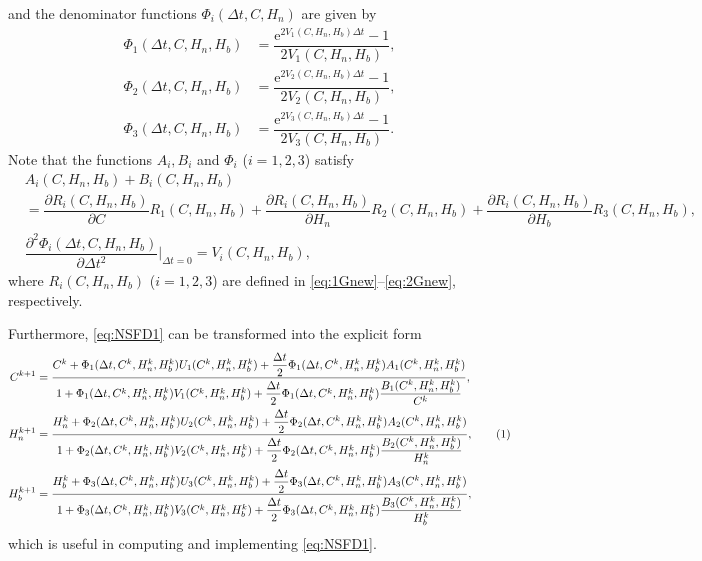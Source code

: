 \documentclass[11pt]{article}
\theoremstyle{definition}
\theoremstyle{remark}
\numberwithin{equation}{section}
\begin{document}
and the denominator functions $\Phi_i(\Delta t, C, H_n)$ are given by 
\begin{equation}\label{eq:NSFD4}
\begin{split}
\Phi_1(\Delta t, C, H_n, H_b) &= \dfrac{\mathrm{e}^{2V_1(C, H_n, H_b)\Delta t} - 1}{2V_1(C, H_n, H_b)},\\
\Phi_2(\Delta t, C, H_n, H_b) &= \dfrac{\mathrm{e}^{2V_2(C, H_n, H_b)\Delta t} - 1}{2V_2(C, H_n, H_b)},\\
\Phi_3(\Delta t, C, H_n, H_b) &= \dfrac{\mathrm{e}^{2V_3(C, H_n, H_b)\Delta t} - 1}{2V_3(C, H_n, H_b)}.
\end{split}
\end{equation}
Note that the functions $A_i, B_i$ and $\Phi_i$ ($i = 1, 2, 3$) satisfy
\begin{equation*}
\begin{split}
&A_i(C, H_n, H_b) + B_i(C, H_n, H_b) \\
&= \dfrac{\partial R_i(C, H_n, H_b)}{\partial C}R_1(C, H_n, H_b) + \dfrac{\partial R_i(C, H_n, H_b)}{\partial H_n}R_2(C, H_n, H_b) + \dfrac{\partial R_i(C, H_n, H_b)}{\partial H_b}R_3(C, H_n, H_b),\\
&\dfrac{\partial^2\Phi_i(\Delta t, C, H_n, H_b)}{\partial \Delta t^2}\bigg|_{\Delta t = 0} = V_i(C, H_n, H_b), 
\end{split}
\end{equation*}
where $R_i(C, H_n, H_b)$ ($i = 1, 2, 3$) are defined in \eqref{eq:1Gnew}--\eqref{eq:2Gnew}, respectively.

Furthermore, \eqref{eq:NSFD1} can be transformed into the explicit form
\begin{align*}
C^{k + 1} &=  \dfrac{C^k + \Phi_1(\Delta t, C^k, H_n^k, H_b^k)U_1(C^k, H_n^k, H_b^k) + \dfrac{\Delta t}{2}\Phi_1(\Delta t, C^k, H_n^k, H_b^k)A_1(C^k, H_n^k, H_b^k)}{1 + \Phi_1(\Delta t, C^k, H_n^k, H_b^k)V_1(C^k, H_n^k, H_b^k) + \dfrac{\Delta t}{2}\Phi_1(\Delta t, C^k, H_n^k, H_b^k)\dfrac{B_1(C^k, H_n^k, H_b^k)}{C^k}},\\
H_n^{k + 1} &=  \dfrac{H_n^k + \Phi_2(\Delta t, C^k, H_n^k, H_b^k)U_2(C^k, H_n^k, H_b^k) + \dfrac{\Delta t}{2}\Phi_2(\Delta t, C^k, H_n^k, H_b^k)A_2(C^k, H_n^k, H_b^k)}{1 + \Phi_2(\Delta t, C^k, H_n^k, H_b^k)V_2(C^k, H_n^k, H_b^k) + \dfrac{\Delta t}{2}\Phi_2(\Delta t, C^k, H_n^k, H_b^k)\dfrac{B_2(C^k, H_n^k, H_b^k)}{H_n^k}},
\stepcounter{equation}\tag{\theequation}\label{eq:NSFD5}\\
H_b^{k + 1} &=  \dfrac{H_b^k + \Phi_3(\Delta t, C^k, H_n^k, H_b^k)U_3(C^k, H_n^k, H_b^k) + \dfrac{\Delta t}{2}\Phi_3(\Delta t, C^k, H_n^k, H_b^k)A_3(C^k, H_n^k, H_b^k)}{1 + \Phi_3(\Delta t, C^k, H_n^k, H_b^k)V_3(C^k, H_n^k, H_b^k) + \dfrac{\Delta t}{2}\Phi_3(\Delta t, C^k, H_n^k, H_b^k)\dfrac{B_3(C^k, H_n^k, H_b^k)}{H_b^k}},
\end{align*}
which is useful in computing and implementing \eqref{eq:NSFD1}.
\end{document}
